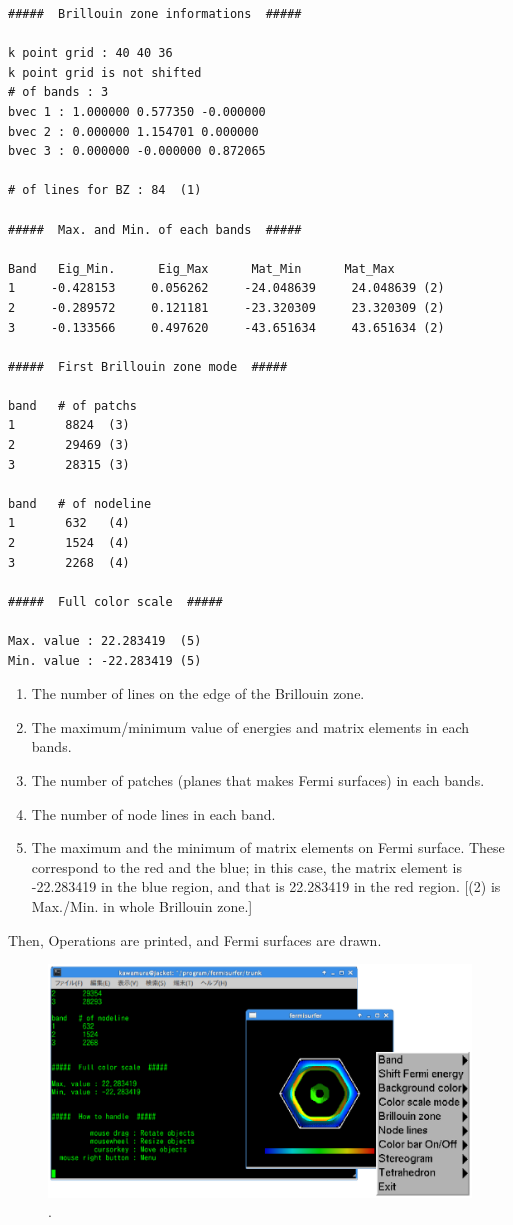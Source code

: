 \documentclass[12pt]{article}
\begin{document}
\begin{verbatim}
#####  Brillouin zone informations  ##### 

k point grid : 40 40 36 
k point grid is not shifted 
# of bands : 3 
bvec 1 : 1.000000 0.577350 -0.000000 
bvec 2 : 0.000000 1.154701 0.000000 
bvec 3 : 0.000000 -0.000000 0.872065 

# of lines for BZ : 84  (1)

#####  Max. and Min. of each bands  ##### 
     
Band   Eig_Min.      Eig_Max      Mat_Min      Mat_Max 
1     -0.428153     0.056262     -24.048639     24.048639 (2)
2     -0.289572     0.121181     -23.320309     23.320309 (2)
3     -0.133566     0.497620     -43.651634     43.651634 (2)

#####  First Brillouin zone mode  #####

band   # of patchs
1       8824  (3)
2       29469 (3)
3       28315 (3)

band   # of nodeline 
1       632   (4)
2       1524  (4)
3       2268  (4)

#####  Full color scale  ##### 

Max. value : 22.283419  (5)
Min. value : -22.283419 (5) 

\end{verbatim}

\begin{enumerate}
  \renewcommand{\labelenumi}{(\arabic{enumi})}
  \item The number of lines on the edge of the Brillouin zone.
  \item The maximum/minimum value of energies and matrix elements in each bands.
  \item The number of patches (planes that makes Fermi surfaces) in each bands.
  \item The number of node lines in each band.
  \item The maximum and the minimum of matrix elements on 
    Fermi surface.
    These correspond to the red and the blue;
    in this case, the matrix element is -22.283419 in the blue region,
    and that is 22.283419 in the red region.
    [(2) is Max./Min. in whole Brillouin zone.]    
\end{enumerate}

Then, Operations are printed, and
Fermi surfaces are drawn.

\begin{figure}[!ht]
  \includegraphics[width=17cm]{figs/start.eps}
  \caption{.}
  \label{fig_start}
\end{figure}
\end{document}
